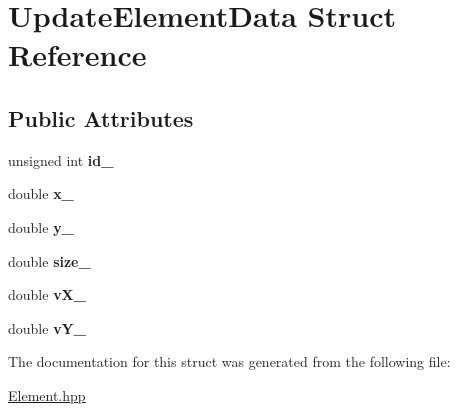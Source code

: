 \hypertarget{structUpdateElementData}{}\section{Update\+Element\+Data Struct Reference}
\label{structUpdateElementData}
\subsection*{Public Attributes}
\begin{DoxyCompactItemize}
\item 
unsigned int {\bfseries id\+\_\+}\hypertarget{structUpdateElementData_a1a3514e0665d80284718b776a32eccbe}{}\label{structUpdateElementData_a1a3514e0665d80284718b776a32eccbe}

\item 
double {\bfseries x\+\_\+}\hypertarget{structUpdateElementData_a1ea1ab4fda073dd2f015b2220f3fc632}{}\label{structUpdateElementData_a1ea1ab4fda073dd2f015b2220f3fc632}

\item 
double {\bfseries y\+\_\+}\hypertarget{structUpdateElementData_ae141528c38fa3379a7ea7ea25c42f873}{}\label{structUpdateElementData_ae141528c38fa3379a7ea7ea25c42f873}

\item 
double {\bfseries size\+\_\+}\hypertarget{structUpdateElementData_a869c55696b410144b51230917333725b}{}\label{structUpdateElementData_a869c55696b410144b51230917333725b}

\item 
double {\bfseries v\+X\+\_\+}\hypertarget{structUpdateElementData_a371672cd72721832a687534d7fcffda8}{}\label{structUpdateElementData_a371672cd72721832a687534d7fcffda8}

\item 
double {\bfseries v\+Y\+\_\+}\hypertarget{structUpdateElementData_a8ef5996e48b498ddeb3decf1a5ccb00b}{}\label{structUpdateElementData_a8ef5996e48b498ddeb3decf1a5ccb00b}

\end{DoxyCompactItemize}


The documentation for this struct was generated from the following file\+:\begin{DoxyCompactItemize}
\item 
\hyperlink{Element_8hpp}{Element.\+hpp}\end{DoxyCompactItemize}
